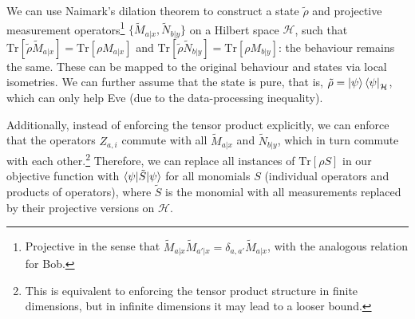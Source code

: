 \documentclass[10pt, a4paper]{article}
\numberwithin{equation}{section} %
\theoremstyle{definition}
\theoremstyle{plain}
\newcommand{\?}{\mathrel{?}} %
\newcommand{\Tr}{\mathrm{Tr}} %
\newcommand{\Hs}{\mathcal{H}} %
\begin{document}
      We can use Naimark's dilation theorem to construct a state \(\tilde{\rho}\) and projective measurement operators\footnote{Projective in the sense that \(\tilde{M}_{a|x}\tilde{M}_{a'|x} = \delta_{a,a'}\tilde{M}_{a|x}\), with the analogous relation for Bob.} \(\{\tilde{M}_{a|x}, \tilde{N}_{b|y}\}\) on a Hilbert space \(\Hs\), such that \(\Tr\left[\tilde{\rho}\tilde{M}_{a|x}\right] = \Tr\left[\rho M_{a|x}\right]\) and  \(\Tr\left[\tilde{\rho}\tilde{N}_{b|y}\right] = \Tr\left[\rho M_{b|y}\right]\): the behaviour remains the same. These can be mapped to the original behaviour and states via local isometries. We can further assume that the state is pure, that is, \(\tilde{\rho} = {\ket{\psi}\bra{\psi}}_{\Hs}\), which can only help Eve (due to the data-processing inequality).

      Additionally, instead of enforcing the tensor product explicitly, we can enforce that the operators \(Z_{a,i}\) commute with all \(\tilde{M}_{a|x}\) and \(\tilde{N}_{b|y}\), which in turn commute with each other.\footnote{This is equivalent to enforcing the tensor product structure in finite dimensions, but in infinite dimensions it may lead to a looser bound.} Therefore, we can replace all instances of \(\Tr\left[\rho S\right]\) in our objective function with \(\braket{\psi|\tilde{S}|\psi}\) for all monomials \(S\) (individual operators and products of operators), where \(\tilde{S}\) is the monomial with all measurements replaced by their projective versions on \(\Hs\). 
\end{document}
